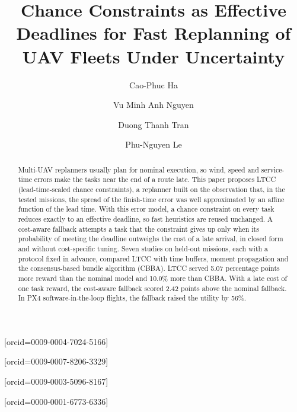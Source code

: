\documentclass[a4paper,fleqn]{cas-dc}
\newcommand{\mname}{LTCC}  %
\newcounter{prop}
\begin{document}
\let\WriteBookmarks\relax


\title[mode=title]{Chance Constraints as Effective Deadlines for Fast Replanning of UAV Fleets Under Uncertainty}

\author[1]{Cao-Phuc Ha}[orcid=0009-0004-7024-5166]

\author[1]{Vu Minh Anh Nguyen}[orcid=0009-0007-8206-3329]

\author[2]{Duong Thanh Tran}[orcid=0009-0003-5096-8167]

\author[3]{Phu-Nguyen Le}[orcid=0000-0001-6773-6336]
\cormark[1]



\begin{abstract}
Multi-UAV replanners usually plan for nominal execution, so wind, speed and service-time errors make the tasks near the
end of a route late. This paper proposes \mname{} (lead-time-scaled chance constraints), a
replanner built on the observation that, in the tested missions, the
spread of the finish-time error was well approximated by an affine function of the lead time. With this error model, a
chance constraint on every task reduces exactly to an effective deadline, so fast heuristics are reused unchanged. A cost-aware fallback attempts a task that the constraint gives up only when its probability of meeting the
deadline outweighs the cost of a late arrival, in closed form and without cost-specific tuning. Seven studies on
held-out missions, each with a protocol fixed in advance, compared \mname{} with time buffers, moment propagation and
the consensus-based bundle algorithm (CBBA). \mname{} served 5.07 percentage points more reward than the
nominal model and 10.0\% more than CBBA. With a late cost of one task reward, the cost-aware fallback
scored 2.42 points above the nominal fallback. In PX4 software-in-the-loop flights, the fallback raised the
utility by 56\%.
\end{abstract}
\end{document}
